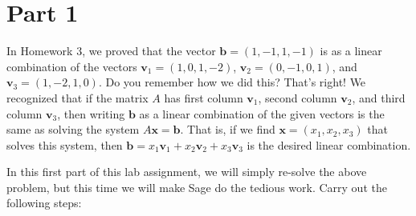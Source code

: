 \documentclass[fleqn,11pt]{paper}
\theoremstyle{remark}
\renewcommand{\vec}[1]{\mathbf{#1}}
\newcommand{\<}{\ensuremath{\langle}}
\renewcommand{\>}{\ensuremath{\rangle}}
\newcommand\vb{\vec{b}}
\newcommand\vv{\vec{v}}
\newcommand\vx{\vec{x}}
\begin{document}
\section*{Part 1}
In Homework 3, we proved that the vector 
    $\vb = (1, -1, 1, -1)$ is as a linear combination 
    of the vectors 
    $\vv_1 = (1 , 0 , 1 , -2)$, 
    $\vv_2 = (0 , -1 , 0 , 1)$, and 
    $\vv_3 = (1, -2 , 1 , 0)$.  Do you remember how we did this?
    That's right! We recognized that if
    the matrix $A$ has first column $\vv_1$, second column $\vv_2$, and third
    column $\vv_3$, then writing $\vb$ as a linear combination of 
    the given vectors is the same as solving the system $A\vx = \vb$.
    That is, if we find $\vx = (x_1, x_2, x_3)$ that solves 
    this system, then $\vb = x_1\vv_1+x_2\vv_2+x_3\vv_3$ is the
    desired linear combination. 

    In this first part of this lab assignment, we will simply re-solve the above problem, but 
    this time we will make Sage do the tedious work.  Carry out the following steps:
\end{document}
